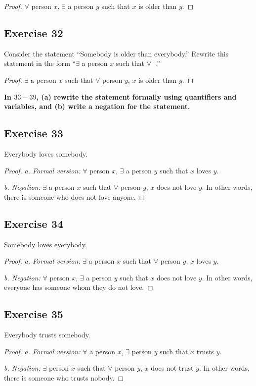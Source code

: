\documentclass[14pt]{extarticle}
\newcommand{\fbl}{\underline{\hspace{1cm}}\,\,}
\newcommand{\fa}{\forall}
\newcommand{\te}{\exists}
\begin{document}
\begin{proof}
$\fa$ person $x$, $\te$ a person $y$ such that $x$ is older than $y$.
\end{proof}

\subsection{Exercise 32}
Consider the statement “Somebody is older than everybody.” Rewrite this statement in the form “$\te$ a person $x$ such that $\fa$ \fbl.”

\begin{proof}
$\te$ a person $x$ such that $\fa$ person $y$, $x$ is older than $y$.
\end{proof}

{\bf \color{cyan} In $33-39$, (a) rewrite the statement formally using quantifiers and variables, and (b) write a negation for the statement.}

\subsection{Exercise 33}
Everybody loves somebody.

\begin{proof}
{\it a. Formal version:} $\fa$ person $x$, $\te$ a person $y$ such that $x$ loves $y$.

{\it b. Negation:} $\te$ a person $x$ such that $\fa$ person $y$, $x$ does not love $y$. In other words, there is someone who
does not love anyone.
\end{proof}

\subsection{Exercise 34}
Somebody loves everybody.

\begin{proof}
{\it a. Formal version:} $\te$ a person $x$ such that $\fa$ person $y$, $x$ loves $y$.

{\it b. Negation:} $\fa$ person $x$, $\te$ a person $y$ such that $x$ does not love $y$. In other words, everyone has someone whom they do not love.
\end{proof}

\subsection{Exercise 35}
Everybody trusts somebody.

\begin{proof}
{\it a. Formal version:} $\fa$ a person $x$, $\te$ person $y$ such that $x$ trusts $y$.

{\it b. Negation:} $\te$ person $x$ such that $\fa$ person $y$, $x$ does not trust $y$. In other words, there is someone who trusts nobody.
\end{proof}
\end{document}
